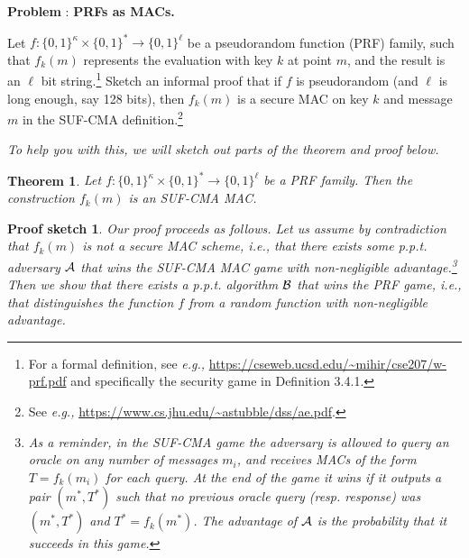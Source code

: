 \documentclass[11pt]{article}
\newtheorem{theorem}{Theorem}
\newtheorem{proofsketch}{Proof sketch}
\newcounter{problem}
\renewcommand{\theproblem}{\arabic{problem}}
\newenvironment{problem} {\stepcounter{problem} \textbf{Problem
    \theproblem}:} {\vspace{.1in}}
\begin{document}
\bigskip \noindent 
\begin{problem} {\bf PRFs as MACs.}

\medskip \noindent
Let $f: \{0,1\}^{\kappa} \times \{0,1\}^* \rightarrow \{0,1\}^{\ell}$ be a pseudorandom function (PRF) family, such that $f_k(m)$ represents the evaluation with key $k$ at point $m$, and the result is an $\ell$ bit string.\footnote{For a formal definition, see {\em e.g.,} \url{https://cseweb.ucsd.edu/~mihir/cse207/w-prf.pdf} and specifically the security game in Definition 3.4.1.}
%
Sketch an informal proof that if $f$ is pseudorandom (and $\ell$ is long enough, say 128 bits), then $f_k(m)$ is a secure MAC on key $k$ and message $m$ in the {\sf SUF-CMA} definition.\footnote{See {\em e.g.,} \url{https://www.cs.jhu.edu/~astubble/dss/ae.pdf}.}

\medskip \noindent
{\em To help you with this, we will sketch out parts of the theorem and proof below.}

\begin{theorem}
{\em
Let $f: \{0,1\}^{\kappa} \times \{0,1\}^* \rightarrow \{0,1\}^{\ell}$ be a PRF family. Then the construction $f_k(m)$ is an {\sf SUF-CMA} MAC.}

\end{theorem}

\begin{proofsketch}
{\em
Our proof proceeds as follows. Let us assume by contradiction that $f_k(m)$ is not a secure MAC scheme, {\em i.e.,} that there exists some p.p.t. adversary ${\cal A}$ that wins the {\sf SUF-CMA} MAC game with non-negligible advantage.\footnote{As a reminder, in the {\sf SUF-CMA} game the adversary is allowed to query an oracle on any number of messages $m_i$, and receives MACs of the form $T = f_k(m_i)$ for each query. At the end of the game it wins if it outputs a pair $(m^*, T^*)$ such that no previous oracle query (resp. response) was $(m^*, T^*)$ and $T^* = f_k(m^*)$. The advantage of ${\cal A}$ is the probability that it succeeds in this game.} Then we show that there exists a p.p.t. algorithm ${\cal B}$ that wins the PRF game, {\em i.e.,} that distinguishes the function $f$ from a random function with non-negligible advantage.

}
\end{proofsketch}
\end{problem}
\end{document}
